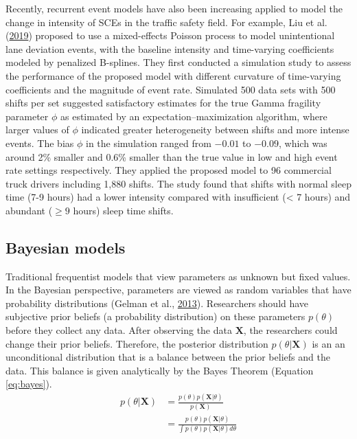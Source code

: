 \documentclass[12pt]{book}
\numberwithin{equation}{chapter}
\begin{document}
Recently, recurrent event models have also been increasing applied to model the change in intensity of SCEs in the traffic safety field. For example, Liu et al. (\protect\hyperlink{ref-liu2019assessing}{2019}) proposed to use a mixed-effects Poisson process to model unintentional lane deviation events, with the baseline intensity and time-varying coefficients modeled by penalized B-splines. They first conducted a simulation study to assess the performance of the proposed model with different curvature of time-varying coefficients and the magnitude of event rate. Simulated 500 data sets with 500 shifts per set suggested satisfactory estimates for the true Gamma fragility parameter \(\phi\) as estimated by an expectation--maximization algorithm, where larger values of \(\phi\) indicated greater heterogeneity between shifts and more intense events. The bias \(\phi\) in the simulation ranged from \(-0.01\) to \(-0.09\), which was around 2\% smaller and 0.6\% smaller than the true value in low and high event rate settings respectively. They applied the proposed model to 96 commercial truck drivers including 1,880 shifts. The study found that shifts with normal sleep time (7-9 hours) had a lower intensity compared with insufficient (\textless{} 7 hours) and abundant (\(\geq 9\) hours) sleep time shifts.

\hypertarget{bayesian-models}{%
\subsection{Bayesian models}\label{bayesian-models}}

Traditional frequentist models that view parameters as unknown but fixed values. In the Bayesian perspective, parameters are viewed as random variables that have probability distributions (Gelman et al., \protect\hyperlink{ref-gelman2013bayesian}{2013}). Researchers should have subjective prior beliefs (a probability distribution) on these parameters \(p(\theta)\) before they collect any data. After observing the data \(\mathbf{X}\), the researchers could change their prior beliefs. Therefore, the posterior distribution \(p(\theta | \mathbf{X})\) is an an unconditional distribution that is a balance between the prior beliefs and the data. This balance is given analytically by the Bayes Theorem (Equation \eqref{eq:bayes}).
\begin{equation}
\begin{split}
p(\theta | \mathbf{X}) & = \frac{p(\theta)p(\mathbf{X}|\theta)}{p(\mathbf{X})} \\
 & = \frac{p(\theta)p(\mathbf{X}|\theta )}{\int p(\theta)p(\mathbf{X}|\theta)d\theta}
\label{eq:bayes}
\end{split}
\end{equation}
\end{document}
